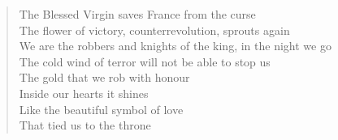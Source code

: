 \begin{quotex}
\begin{verse}
The Blessed Virgin saves France from the curse\\
The flower of victory, counterrevolution, sprouts again\\
We are the robbers and knights of the king, in the night we go\\
The cold wind of terror will not be able to stop us\\
The gold that we rob with honour\\
Inside our hearts it shines\\
Like the beautiful symbol of love\\
That tied us to the throne\\
\end{verse}
\end{quotex}




